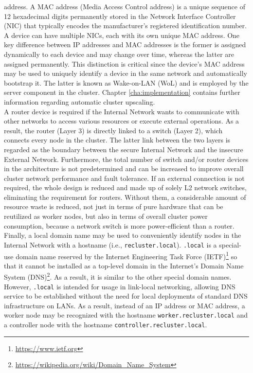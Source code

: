 address. A MAC address (Media Access Control address) is a unique sequence of 12
hexadecimal digits permanently stored in the Network Interface Controller (NIC)
that typically encodes the manufacturer's registered identification number. A device
can have multiple NICs, each with its own unique MAC address\cite{mac_address}.
One key difference between IP addresses and MAC addresses is the former is
assigned dynamically to each device and may change over time, whereas the latter
are assigned permanently. This distinction is critical since the device's MAC
address may be used to uniquely identify a device in the same network and
automatically bootstrap it. The latter is known as Wake-on-LAN (WoL) and is employed
by the server component in the cluster. Chapter \ref{cha:implementation}
contains further information regarding automatic cluster upscaling. \\ %
A router device is required if the Internal Network wants to communicate with
other networks to access various resources or execute external operations. As a result,
the router (Layer 3) is directly linked to a switch (Layer 2), which connects every
node in the cluster. The latter link between the two layers is regarded as the
boundary between the secure Internal Network and the insecure External Network. Furthermore,
the total number of switch and/or router devices in the architecture is not
predetermined and can be increased to improve overall cluster network
performance and fault tolerance. If an external connection is not required, the
whole design is reduced and made up of solely L2 network switches, eliminating the
requirement for routers. Without them, a considerable amount of resource waste is
reduced, not just in terms of pure hardware that can be reutilized as worker
nodes, but also in terms of overall cluster power consumption, because a network
switch is more power-efficient than a router\cite{switch_vs_router_power_consumption}.
\\ %
Finally, a local domain name may be used to conveniently identify nodes in the
Internal Network with a hostname (i.e., \texttt{recluster.local}). \texttt{.local}
is a special-use domain name reserved by the Internet Engineering Task Force (IETF)\footnote{\url{https://www.ietf.org}}
so that it cannot be installed as a top-level domain in the Internet's Domain
Name System (DNS)\footnote{\url{https://wikipedia.org/wiki/Domain_Name_System}}.
As a result, it is similar to the other special domain names. However, \texttt{.local}
is intended for usage in link-local networking, allowing DNS service to be established
without the need for local deployments of standard DNS infrastructure on LANs\cite{local_domain_name}\cite{reserved_dns_names}.
As a result, instead of an IP address or MAC address, a worker node may be
recognized with the hostname \texttt{worker.recluster.local} and a controller node
with the hostname \texttt{controller.recluster.local}.

